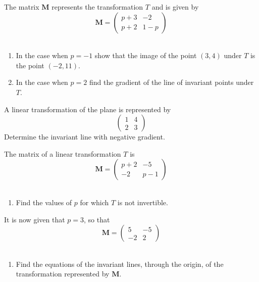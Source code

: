\documentclass[leqno]{article}
\begin{document}
\djsFrontMatter
\begin{enumerate}[
  label=\textbf{\arabic*.},
  leftmargin=*,
  topsep=0pt,
  partopsep=0pt,
  parsep=0pt
]


\questionitem

The matrix $\mathbf{M}$ represents the transformation $T$ and is given by
\[
\mathbf{M} = \begin{pmatrix}
p + 3 & -2 \\[6pt]
 p + 2 & 1 - p
\end{pmatrix}
\] \\
\begin{enumerate}[label=\textbf{(\alph*)}]
  \item In the case when $p = -1$ show that the image of the point $(3, 4)$ under $T$ is the point $(-2, 11)$.  \\
  \item In the case when $p = 2$ find the gradient of the line of invariant points under $T$.  \\
\end{enumerate}

\newpage

\questionitem

A linear transformation of the plane is represented by
\[
\begin{pmatrix}
1 & 4 \\
2 & 3
\end{pmatrix}
\]
Determine the invariant line with negative gradient. 

\newpage

\questionitem

The matrix of a linear transformation $T$ is
\[
\mathbf{M} = \begin{pmatrix} p+2 & -5 \\[6pt] -2 & p-1 \end{pmatrix}
\] \\
\begin{enumerate}[label=\textbf{(\alph*)}]
  \item Find the values of $p$ for which $T$ is not invertible.  \\
\end{enumerate}
It is now given that $p = 3$, so that
\[
\mathbf{M} = \begin{pmatrix} 5 & -5 \\ -2 & 2 \end{pmatrix}
\] \\
\begin{enumerate}[label=\textbf{(\alph*)}, resume]
  \item Find the equations of the invariant lines, through the origin, of the transformation represented by $\mathbf{M}$.  \\
\end{enumerate}


\end{enumerate}
\end{document}
